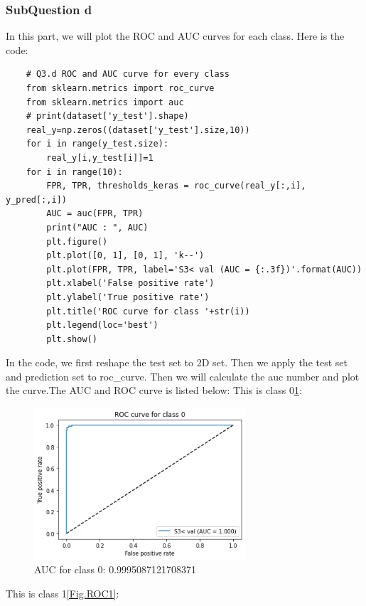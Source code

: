 \documentclass[conference]{IEEEtran}
\begin{document}
\subsubsection{SubQuestion d}
In this part, we will plot the ROC and AUC curves for each class.
Here is the code:
\begin{lstlisting}
    # Q3.d ROC and AUC curve for every class
    from sklearn.metrics import roc_curve
    from sklearn.metrics import auc
    # print(dataset['y_test'].shape)
    real_y=np.zeros((dataset['y_test'].size,10))
    for i in range(y_test.size):
        real_y[i,y_test[i]]=1
    for i in range(10):
        FPR, TPR, thresholds_keras = roc_curve(real_y[:,i], y_pred[:,i])   
        AUC = auc(FPR, TPR)
        print("AUC : ", AUC)
        plt.figure()
        plt.plot([0, 1], [0, 1], 'k--')
        plt.plot(FPR, TPR, label='S3< val (AUC = {:.3f})'.format(AUC))
        plt.xlabel('False positive rate')
        plt.ylabel('True positive rate')
        plt.title('ROC curve for class '+str(i))
        plt.legend(loc='best')
        plt.show()   
\end{lstlisting}
In the code, we first reshape the test set to 2D set. Then we apply the test set and prediction set to roc_curve.
Then we will calculate the auc number and plot the curve.The AUC and ROC curve is listed below:
This is class 0\ref{Fig.ROC0}:
\begin{figure}[H] 
    \centering %
    \includegraphics[width=0.7\textwidth]{ROC0.png} %
    \caption{AUC for class 0:  0.9995087121708371} %
    \label{Fig.ROC0} %
\end{figure}
This is class 1\ref{Fig.ROC1}:
\end{document}
